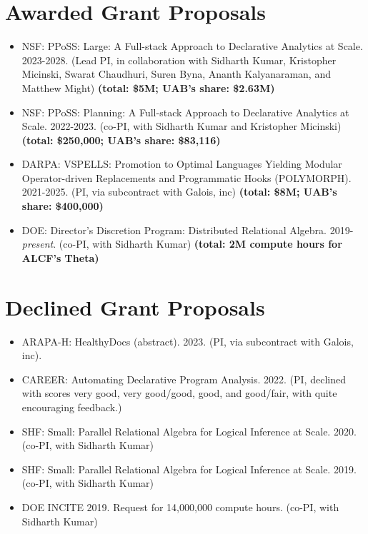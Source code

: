 \documentclass[line]{res}
\begin{document}
\begin{resume}


\section{\large Awarded Grant Proposals} \vspace{0.5cm}

\begin{itemize}
  \item
  NSF: PPoSS: Large: A Full-stack Approach to Declarative Analytics at Scale. 2023-2028. (Lead PI, in collaboration with Sidharth Kumar, Kristopher Micinski, Swarat Chaudhuri, Suren Byna, Ananth Kalyanaraman, and Matthew Might) \textbf{(total: \$5M; UAB's share: \$2.63M)} 
  \item
  NSF: PPoSS: Planning: A Full-stack Approach to Declarative Analytics at Scale. 2022-2023. (co-PI, with Sidharth Kumar and Kristopher Micinski) \textbf{(total: \$250,000; UAB's share: \$83,116)} 
  \item
  DARPA: VSPELLS: Promotion to Optimal Languages Yielding Modular Operator-driven Replacements and Programmatic Hooks (POLYMORPH). 2021-2025. (PI, via subcontract with Galois, inc) \textbf{(total: \$8M; UAB's share: \$400,000)}
  \item
  DOE: Director's Discretion Program: Distributed Relational Algebra. 2019-\textit{present}. (co-PI, with Sidharth Kumar) \textbf{(total: 2M compute hours for ALCF's Theta)}
\end{itemize}

\section{\large Declined Grant Proposals} \vspace{0.5cm}

\begin{itemize}  
  \item
  ARAPA-H: HealthyDocs (abstract). 2023. (PI, via subcontract with Galois, inc).
  \item
  CAREER: Automating Declarative Program Analysis. 2022. (PI, declined with scores very good, very good/good, good, and good/fair, with quite encouraging feedback.) 
  \item
  SHF: Small: Parallel Relational Algebra for Logical Inference at Scale. 2020. (co-PI, with Sidharth Kumar) 
  \item
  SHF: Small: Parallel Relational Algebra for Logical Inference at Scale. 2019. (co-PI, with Sidharth Kumar)
  \item
  DOE INCITE 2019. Request for 14,000,000 compute hours. (co-PI, with Sidharth Kumar)  
\end{itemize}


\end{resume}
\end{document}
